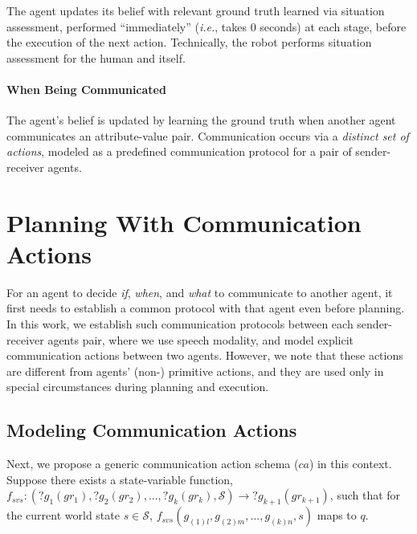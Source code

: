\documentclass[letterpaper]{article} %
\begin{document}
The agent updates its belief with relevant ground truth learned via situation assessment, performed ``immediately'' (\textit{i.e.}, takes $0$ seconds) at each stage, before the execution of the next action. Technically, the robot performs situation assessment for the human and itself.

\paragraph{When Being Communicated}
The agent's belief is updated by learning the ground truth when another agent communicates an attribute-value pair. Communication occurs via a \textit{distinct set of actions}, modeled as a predefined communication protocol for a pair of sender-receiver agents. 



\section{Planning With Communication Actions}
For an agent to decide \textit{if}, \textit{when}, and \textit{what} to communicate to another agent, it first needs to establish a common protocol with that agent even before planning.  
In this work, we establish such communication protocols between each sender-receiver agents pair, where we use speech modality, and model explicit communication actions between two agents. 
However, we note that these actions are different from agents' (non-) primitive actions, and they are used only in special circumstances during planning and execution.

\subsection{Modeling Communication Actions} 
Next, we propose a generic communication action schema ($ca$) in this context. 
% 
Suppose there exists a state-variable function,  $f_{svs}:(?g_1 (gr_1), ?g_2 (gr_2), ..., ?g_k (gr_k),\mathcal{S}) \rightarrow ?g_{k+1} (gr_{k+1})$, such that
for the current world state $s \in \mathcal{S}$, 
$f_{\textit{svs}}(g_{(1)l},g_{(2)m},...,g_{(k)n},s)$ maps to $q$.
\end{document}
